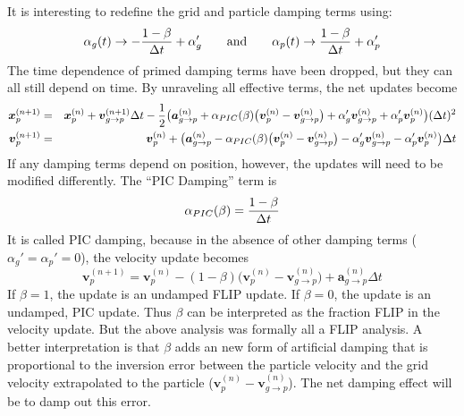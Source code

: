 \documentclass[11pt]{article}
\renewcommand{\vec}[1]{\boldsymbol{#1}}
\begin{document}
It is interesting to redefine the grid and particle damping terms using:
\begin{equation}
     \alpha_g(t) \to -{1-\beta\over\Delta t} + \alpha_g' \qquad{\rm and}\qquad \alpha_p(t) \to {1-\beta\over\Delta t} + \alpha_p'
     \label{PICDamping}
\end{equation}
The time dependence of primed damping terms have been dropped, but they can all still depend on time. 
By unraveling all effective terms, the net updates become
\begin{eqnarray}
   \vec{x}_{p}^{(n+1)} & = & \vec{x}_p^{(n)} +\vec v_{g\to p}^{(n+1)}\Delta t - {1 \over 2}\bigl(\vec{a}_{g\to p}^{(n)} 
       + \alpha_{PIC}(\beta)\bigl(\vec v_p^{(n)}-\vec v_{g\to p}^{(n)}\bigr) +   \alpha_g'\vec v_{g\to p}^{(n)}+  \alpha_p'\vec v_p^{(n)} \bigr)(\Delta t)^2  \\
   \vec{v}_{p}^{(n+1)} & = & \vec{v}_p^{(n)} + \bigl(\vec{a}_{g\to p}^{(n)} - \alpha_{PIC}(\beta)\bigl(\vec v_p^{(n)}-\vec v_{g\to p}^{(n)}\bigr)
         -  \alpha_g'\vec{v}_{g\to p}^{(n)} -  \alpha_p'\vec{v}_p^{(n)} \bigr)\Delta t 
\end{eqnarray}
If any damping terms depend on position, however, the updates will need to be modified differently. The ``PIC Damping'' term is
\begin{equation}
       \alpha_{PIC}(\beta) = {1-\beta\over \Delta t}
\end{equation}
It is called PIC damping, because in the absence of other damping terms ($\alpha_g'=\alpha_p'=0$), the velocity update becomes
\begin{equation}
   \vec{v}_{p}^{(n+1)} = \vec{v}_p^{(n)}  - (1-\beta)\bigl(\vec v_p^{(n)}-\vec v_{g\to p}^{(n)}\bigr)
         + \vec{a}_{g\to p}^{(n)}\Delta t 
\end{equation}
If $\beta=1$, the update is an undamped FLIP update. If $\beta=0$, the update is an undamped, PIC update. Thus $\beta$ can be interpreted as the fraction FLIP in the velocity update. But the above analysis was formally all a FLIP analysis. A better interpretation is that $\beta$ adds an new form of artificial damping that is proportional to the inversion error between the particle velocity and the grid velocity extrapolated to the particle ($\vec v_p^{(n)}-\vec v_{g\to p}^{(n)}$). The net damping effect will be to damp out this error.
\end{document}
